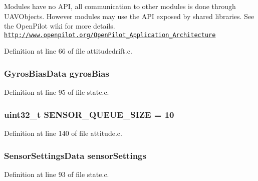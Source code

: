 Modules have no A\-P\-I, all communication to other modules is done through U\-A\-V\-Objects. However modules may use the A\-P\-I exposed by shared libraries. See the Open\-Pilot wiki for more details. \href{http://www.openpilot.org/OpenPilot_Application_Architecture}{\tt http\-://www.\-openpilot.\-org/\-Open\-Pilot\-\_\-\-Application\-\_\-\-Architecture} 

Definition at line 66 of file attitudedrift.\-c.

\hypertarget{group___attitude_ga233a2d6850e9c466f80ae6bb2ebd98e8}{
\subsubsection[{gyros\-Bias}]{\setlength{\rightskip}{0pt plus 5cm}Gyros\-Bias\-Data gyros\-Bias}}\label{group___attitude_ga233a2d6850e9c466f80ae6bb2ebd98e8}


Definition at line 95 of file state.\-c.

\hypertarget{group___attitude_ga5c62d2531c3e579a49d025858bd52a83}{
\subsubsection[{S\-E\-N\-S\-O\-R\-\_\-\-Q\-U\-E\-U\-E\-\_\-\-S\-I\-Z\-E}]{ {\bf uint32\-\_\-t} S\-E\-N\-S\-O\-R\-\_\-\-Q\-U\-E\-U\-E\-\_\-\-S\-I\-Z\-E = 10}}\label{group___attitude_ga5c62d2531c3e579a49d025858bd52a83}


Definition at line 140 of file attitude.\-c.

\hypertarget{group___attitude_ga7e2b26cdc0322ab9457559aa2b94f8fc}{
\subsubsection[{sensor\-Settings}]{\setlength{\rightskip}{0pt plus 5cm}Sensor\-Settings\-Data sensor\-Settings}}\label{group___attitude_ga7e2b26cdc0322ab9457559aa2b94f8fc}


Definition at line 93 of file state.\-c.

